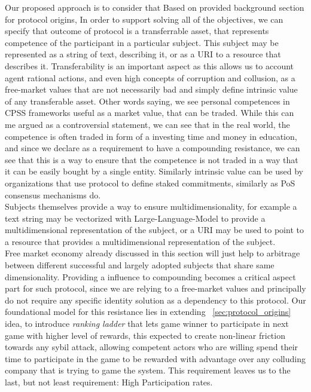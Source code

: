\documentclass{article}
\begin{document}
\begin{CJK}{UTF8}{gbsn}
\begin{multicols}{2}
Our proposed approach is to consider that
Based on provided background section for protocol origins, In order to support solving all of the objectives, we can specify that outcome of protocol is a transferrable asset, that represents competence of the participant in a particular subject. This subject may be represented as a string of text, describing it, or as a URI to a resource that describes it.
Transferability is an important aspect as this allows us to account agent rational actions, and even high concepts of corruption and collusion, as a free-market values that are not necessarily bad and simply define intrinsic value of any transferable asset. Other words saying, we see personal competences in CPSS frameworks useful as a market value, that can be traded. While this can me argued as a controversial statement, we can see that in the real world, the competence is often traded in form of a investing time and money in education, and since we declare as a requirement to have a compounding resistance, we can see that this is a way to ensure that the competence is not traded in a way that it can be easily bought by a single entity. Similarly intrinsic value can be used by organizations that use protocol to define staked commitments, similarly as PoS consensus mechanisms do.\\
Subjects themselves provide a way to ensure multidimensionality, for example a text string may be vectorized with Large-Language-Model to provide a multidimensional representation of the subject, or a URI may be used to point to a resource that provides a multidimensional representation of the subject.\\
Free market economy already discussed in this section will just help to arbitrage between different successful and largely adopted subjects that share same dimensionality.
Providing a influence to compounding becomes a critical aspect part for such protocol, since we are relying to a free-market values and principally do not require any specific identity solution as a dependency to this protocol.
Our foundational model for this resistance lies in extending  ~\ref{sec:protocol_origins} idea, to introduce \textit{ranking ladder} that lets game winner to participate in next game with higher level of rewards, this expected to create non-linear friction towards any sybil attack, allowing competent actors who are willing spend their time to participate in the game to be rewarded with advantage over any colluding company that is trying to game the system.
This requirement leaves us to the last, but not least requirement: High Participation rates.

\end{multicols}
\end{CJK}
\end{document}
